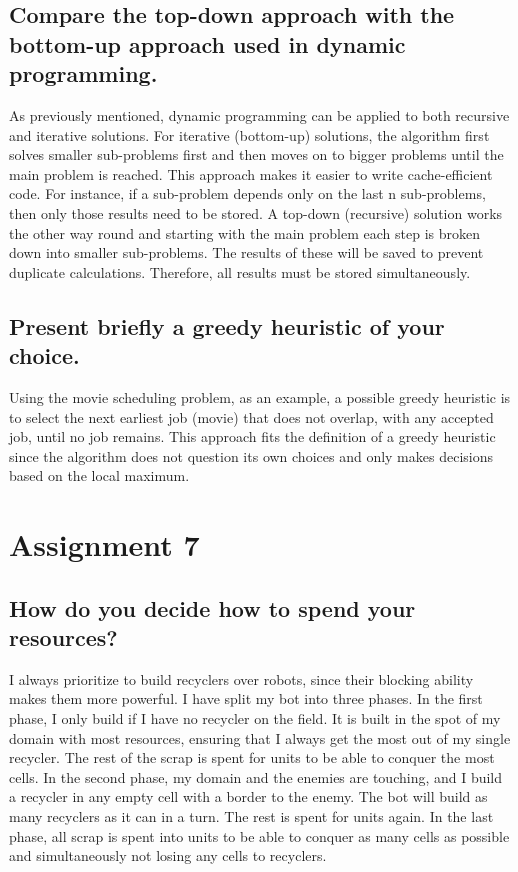 \documentclass[runningheads]{llncs}
\begin{document}
\subsection*{Compare the top-down approach with the bottom-up approach used in dynamic programming.}
As previously mentioned, dynamic programming can be applied to both recursive and iterative solutions. For iterative (bottom-up) solutions, the algorithm first solves
smaller sub-problems first and then moves on to bigger problems until the main problem is reached. This approach makes it easier to write cache-efficient code. For
instance, if a sub-problem depends only on the last n sub-problems, then only those results need to be stored. A top-down (recursive) solution works the other way round and
starting with the main problem each step is broken down into smaller sub-problems. The results of these will be saved to prevent duplicate calculations. Therefore,
all results must be stored simultaneously.

\subsection*{Present briefly a greedy heuristic of your choice.}
Using the movie scheduling problem, as an example, a possible greedy heuristic is to select the next earliest job (movie) that does not overlap, with any accepted job, until
no job remains. This approach fits the definition of a greedy heuristic since the algorithm does not question its own choices and only makes decisions based on the local maximum.

\section*{Assignment 7}

\subsection*{How do you decide how to spend your resources?}
I always prioritize to build recyclers over robots, since their blocking ability makes them more powerful. I have split my bot into three phases. In the first phase, I only build if
I have no recycler on the field. It is built in the spot of my domain with most resources, ensuring that I always get the most out of my single recycler. The rest of the scrap is
spent for units to be able to conquer the most cells. In the second phase, my domain and the enemies are touching, and I build a recycler in any empty cell with a border to the enemy. The bot will build as many recyclers
as it can in a turn. The rest is spent for units again. In the last phase, all scrap is spent into units to be able to conquer as many cells as possible and simultaneously not losing
any cells to recyclers.
\end{document}
